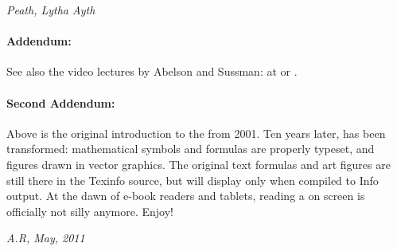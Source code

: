 \vspace{0.5em}
\noindent
\textit{Peath, Lytha Ayth}

\paragraph{Addendum:}
See also the  video lectures by Abelson and Sussman: at \href{http://groups.csail.mit.edu/mac/classes/6.001/abelson-sussman-lectures/}{} or
\href{http://ocw.mit.edu/courses/electrical-engineering-and-computer-science/6-001-structure-and-interpretation-of-computer-programs-spring-2005/video-lectures/}{}.

\paragraph{Second Addendum:}
Above is the original introduction to the  from 2001.
Ten years later,  has been transformed:
mathematical symbols and formulas are properly typeset, and figures drawn in vector graphics.
The original text formulas and  art figures are still there in the Texinfo source, but will display only when compiled to Info output.
At the dawn of e-book readers and tablets, reading a  on screen is officially not silly anymore.
Enjoy!

\vspace{0.5em}
\noindent
\textit{A.R, May, 2011}
